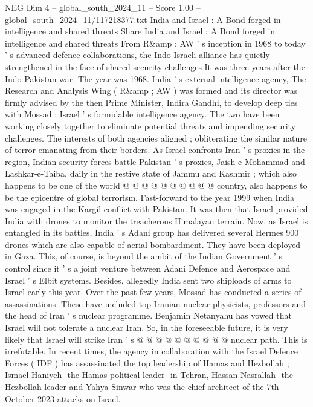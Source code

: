 \begin{textsample}{NEG Dim 4 – global\_south\_2024\_11 – Score 1.00 – global\_south\_2024\_11/117218377.txt}  \label{ex:f4_neg_209}
India and Israel : A Bond forged in intelligence and shared threats Share India and Israel : A Bond forged in intelligence and shared threats From R\&amp ; AW ' s inception in 1968 to today ' s advanced defence collaborations, the Indo-Israeli alliance has quietly strengthened in the face of shared security challenges It was three years after the Indo-Pakistan war.
The year was 1968.
India ' s external intelligence agency, The Research and Analysis Wing ( R\&amp ; AW ) was formed and its director was firmly advised by the then Prime Minister, Indira Gandhi, to develop deep ties with Mossad ; Israel ' s formidable intelligence agency.
The two have been working closely together to eliminate potential threats and impending security challenges.
The interests of both agencies aligned ; obliterating the similar nature of terror emanating from their borders.
As Israel confronts Iran ' s proxies in the region, Indian security forces battle Pakistan ' s proxies, Jaish-e-Mohammad and Lashkar-e-Taiba, daily in the restive state of Jammu and Kashmir ; which also happens to be one of the world @ @ @ @ @ @ @ @ @ @ country, also happens to be the epicentre of global terrorism.
Fast-forward to the year 1999 when India was engaged in the Kargil conflict with Pakistan.
It was then that Israel provided India with drones to monitor the treacherous Himalayan terrain.
Now, as Israel is entangled in its battles, India ' s Adani group has delivered several Hermes 900 drones which are also capable of aerial bombardment.
They have been deployed in Gaza.
This, of course, is beyond the ambit of the Indian Government ' s control since it ' s a joint venture between Adani Defence and Aerospace and Israel ' s Elbit systems.
Besides, allegedly India sent two shiploads of arms to Israel early this year.
Over the past few years, Mossad has conducted a series of assassinations.
These have included top Iranian nuclear physicists, professors and the head of Iran ' s nuclear programme.
Benjamin Netanyahu has vowed that Israel will not tolerate a nuclear Iran.
So, in the foreseeable future, it is very likely that Israel will strike Iran ' s @ @ @ @ @ @ @ @ @ @ nuclear path.
This is irrefutable.
In recent times, the agency in collaboration with the Israel Defence Forces ( IDF ) has assassinated the top leadership of Hamas and Hezbollah ; Ismael Haniyeh- the Hamas political leader- in Tehran, Hassan Nasrallah- the Hezbollah leader and Yahya Sinwar who was the chief architect of the 7th October 2023 attacks on Israel.

\end{textsample}
